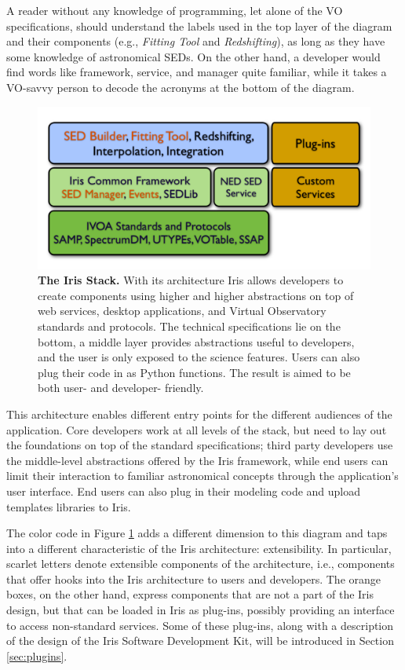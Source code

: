 \documentclass[preprint,authoryear,5p]{elsarticle}
\begin{document}
A reader without any knowledge of programming, let alone of the VO
specifications, should understand the labels used in the top layer of the
diagram and their components (e.g., \textit{Fitting Tool} and \textit{Redshifting}), as long as they
have some knowledge of astronomical SEDs. On the other hand, a developer would
find words like framework, service, and manager quite familiar, while it takes a
VO-savvy person to decode the acronyms at the bottom of the diagram.

\begin{figure}
\begin{center}
\includegraphics[width=1.0\columnwidth]{IrisStack.pdf} \caption{\textbf{The
Iris Stack.}  With its architecture Iris allows developers to create components
using higher and higher abstractions on top of web services, desktop
applications, and Virtual Observatory standards and protocols. The technical
specifications lie on the bottom, a middle layer provides abstractions useful to
developers, and the user is only exposed to the science features. Users can also
plug their code in as Python functions. The result is aimed to be both user- and
developer- friendly.}
\label{fig:stack}
\end{center}
\end{figure}

This architecture enables different entry points for the different audiences of the
application. Core developers work at all levels of the stack, but need to lay
out the foundations on top of the standard specifications; third party
developers use the middle-level abstractions offered by the Iris framework,
while end users can limit their interaction to familiar astronomical concepts
through the application's user interface. End users can also plug in their
modeling code and upload templates libraries to Iris.

The color code in Figure \ref{fig:stack} adds a different dimension to this
diagram and taps into a different characteristic of the Iris architecture:
extensibility. In particular, scarlet letters denote extensible
components of the architecture, i.e., components that offer hooks into the Iris
architecture to users and developers. The orange boxes, on the other hand,
express components that are not a part of the Iris design, but that can be
loaded in Iris as plug-ins, possibly providing an interface to access
non-standard services. Some of these plug-ins, along with a description of the
design of the Iris Software Development Kit, will be introduced in Section
\ref{sec:plugins}.
\end{document}
